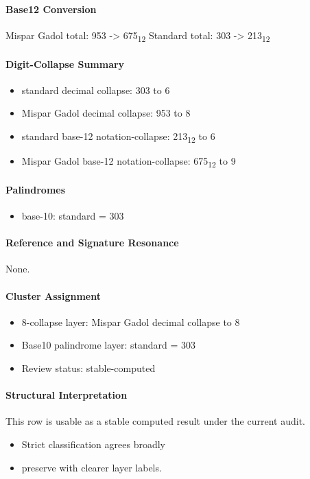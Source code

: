\paragraph{Base12 Conversion}
Mispar Gadol total: 953 -> 675\textsubscript{12}
Standard total: 303 -> 213\textsubscript{12}
\paragraph{Digit-Collapse Summary}
\begin{itemize}
\item standard decimal collapse: 303 to 6
\item Mispar Gadol decimal collapse: 953 to 8
\item standard base-12 notation-collapse: 213\textsubscript{12} to 6
\item Mispar Gadol base-12 notation-collapse: 675\textsubscript{12} to 9
\end{itemize}
\paragraph{Palindromes}
\begin{itemize}
\item base-10: standard = 303
\end{itemize}
\paragraph{Reference and Signature Resonance}
None.
\paragraph{Cluster Assignment}
\begin{itemize}
\item 8-collapse layer: Mispar Gadol decimal collapse to 8
\item Base10 palindrome layer: standard = 303
\item Review status: stable-computed
\end{itemize}
\paragraph{Structural Interpretation}
This row is usable as a stable computed result under the current audit.

\begin{itemize}
\item Strict classification agrees broadly
\item preserve with clearer layer labels.
\end{itemize}

